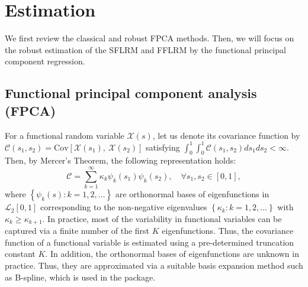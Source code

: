 \section*{Estimation}

We first review the classical and robust FPCA methods. Then, we will focus on the robust estimation of the SFLRM and FFLRM by the functional principal component regression.

\subsection*{Functional principal component analysis (FPCA)}

For a functional random variable $\mathcal{X}(s)$, let us denote its covariance function by $\mathcal{C}(s_1, s_2) = \text{Cov}[\mathcal{X}(s_1),~\mathcal{X}(s_2)]$ satisfying $\int_0^1 \int_0^1 \mathcal{C}(s_1, s_2) ds_1 ds_2 < \infty$. Then, by Mercer's Theorem, the following representation holds:
\begin{equation*}
\mathcal{C} = \sum_{k=1}^{\infty} \kappa_k \psi_k(s_1) \psi_k(s_2), \quad \forall s_1, s_2 \in [0,1],
\end{equation*}
where $\left \lbrace \psi_k(s): k = 1, 2, \ldots \right \rbrace$ are orthonormal bases of eigenfunctions in $\mathcal{L}_2[0,1]$ corresponding to the non-negative eigenvalues $\left \lbrace \kappa_k: k = 1, 2, \ldots \right \rbrace$ with $\kappa_k \geq \kappa_{k+1}$. In practice, most of the variability in functional variables can be captured via a finite number of the first $K$ eigenfunctions. Thus, the covariance function of a functional variable is estimated using a pre-determined truncation constant $K$. In addition, the orthonormal bases of eigenfunctions are unknown in practice. Thus, they are approximated via a suitable basis expansion method such as B-spline, which is used in the  package.

